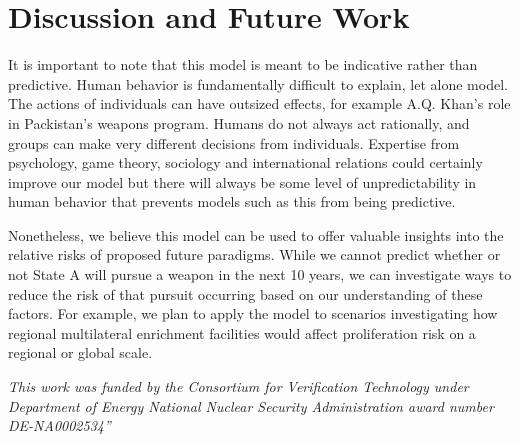 \section{Discussion and Future Work}
\label{s_dis}

It is important to note that this model is meant to be indicative rather than predictive. Human behavior is fundamentally difficult to explain, let alone model.  The actions of individuals can have outsized effects, for example A.Q. Khan's role in Packistan's weapons program.  Humans do not always act rationally, and groups can make very different decisions from individuals.  Expertise from psychology, game theory, sociology and international relations could certainly improve our model but there will always be some level of unpredictability in human behavior that prevents models such as this from being predictive.

Nonetheless, we believe this model can be used to offer valuable insights into the relative risks of proposed future paradigms. While we cannot predict whether or not State A will pursue a weapon in the next 10 years, we can investigate ways to reduce the risk of that pursuit occurring based on our understanding of these factors. For example, we plan to apply the model to scenarios investigating how regional multilateral enrichment facilities would affect proliferation risk on a regional or global scale.  


\textit{This work was funded by the Consortium for Verification Technology under Department of Energy National Nuclear Security Administration award number DE-NA0002534”}
